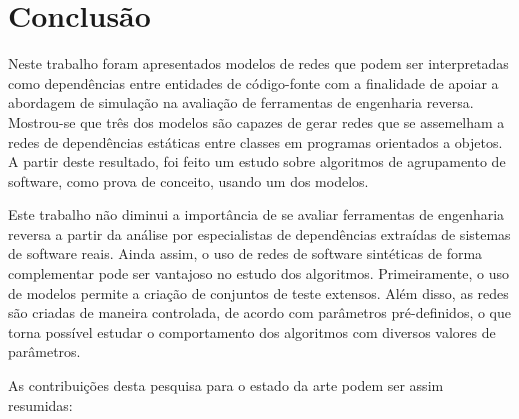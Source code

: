 

\chapter{Conclusão} \label{cap:conclusao}

Neste trabalho foram apresentados modelos de redes que podem ser interpretadas como dependências entre entidades de código-fonte com a finalidade de apoiar a abordagem de simulação na avaliação de ferramentas de engenharia reversa. Mostrou-se que três dos modelos são capazes de gerar redes que se assemelham a redes de dependências estáticas entre classes em programas orientados a objetos. A partir deste resultado, foi feito um estudo sobre algoritmos de agrupamento de software, como prova de conceito, usando um dos modelos.


Este trabalho não diminui a importância de se avaliar ferramentas de engenharia reversa a partir da análise por especialistas de dependências extraídas de sistemas de software reais. Ainda assim, o uso de redes de software sintéticas de forma complementar pode ser vantajoso no estudo dos algoritmos. Primeiramente, o uso de modelos permite a criação de conjuntos de teste extensos. Além disso, as redes são criadas de maneira controlada, de acordo com parâmetros pré-definidos, o que torna possível estudar o comportamento dos algoritmos com diversos valores de parâmetros.


As contribuições desta pesquisa para o estado da arte podem ser assim resumidas:

